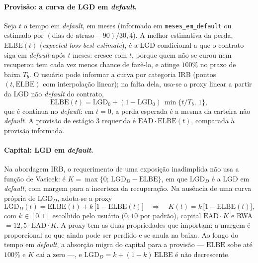 \documentclass[11pt,a4paper]{article}
\begin{document}
\paragraph{Provisão: a curva de LGD em \emph{default}.} Seja $t$ o tempo em \emph{default}, em meses (informado em \texttt{meses\_em\_default} ou estimado por $(\text{dias de atraso}-90)/30{,}4$). A melhor estimativa da perda, $\mathrm{ELBE}(t)$ (\emph{expected loss best estimate}), é a LGD condicional a que o contrato siga em \emph{default} após $t$ meses: cresce com $t$, porque quem não se curou nem recuperou tem cada vez menos chance de fazê-lo, e atinge $100\%$ no prazo de baixa $T_b$. O usuário pode informar a curva por categoria IRB (pontos $(t,\mathrm{ELBE})$ com interpolação linear); na falta dela, usa-se a proxy linear a partir da LGD não \emph{default} do contrato,
\begin{equation}\label{eq:elbe}
\mathrm{ELBE}(t)=\mathrm{LGD}_0+(1-\mathrm{LGD}_0)\,\min\{t/T_b,\,1\},
\end{equation}
que é contínua no \emph{default}: em $t=0$, a perda esperada é a mesma da carteira não \emph{default}. A provisão de estágio 3 requerida é $\mathrm{EAD}\cdot\mathrm{ELBE}(t)$, comparada à provisão informada.

\paragraph{Capital: LGD em \emph{default}.} Na abordagem IRB, o requerimento de uma exposição inadimplida não usa a função de Vasicek: é $K=\max\{0;\,\mathrm{LGD}_D-\mathrm{ELBE}\}$, em que $\mathrm{LGD}_D$ é a LGD em \emph{default}, com margem para a incerteza da recuperação. Na ausência de uma curva própria de $\mathrm{LGD}_D$, adota-se a proxy
\begin{equation}\label{eq:lgdd}
\mathrm{LGD}_D(t)=\mathrm{ELBE}(t)+k\,\bigl[1-\mathrm{ELBE}(t)\bigr]\quad\Longrightarrow\quad K(t)=k\,\bigl[1-\mathrm{ELBE}(t)\bigr],
\end{equation}
com $k\in[0,1]$ escolhido pelo usuário ($0{,}10$ por padrão), capital $\mathrm{EAD}\cdot K$ e RWA $=12{,}5\cdot\mathrm{EAD}\cdot K$. A proxy tem as duas propriedades que importam: a margem é proporcional ao que ainda pode ser perdido e se anula na baixa. Ao longo do tempo em \emph{default}, a absorção migra do capital para a provisão --- $\mathrm{ELBE}$ sobe até $100\%$ e $K$ cai a zero ---, e $\mathrm{LGD}_D=k+(1-k)\,\mathrm{ELBE}$ é não decrescente.
\end{document}
